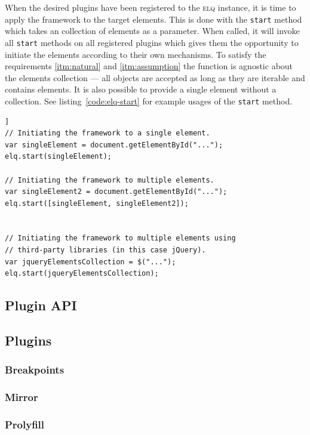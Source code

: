 \documentclass[a4paper,11pt]{kth-mag}
\newcommand{\code}[1]{\texttt{#1}}
\begin{document}
          When the desired plugins have been registered to the \textsc{elq} instance, it is time to apply the framework to the target elements.
          This is done with the \code{start} method which takes an collection of elements as a parameter.
          When called, it will invoke all \code{start} methods on all registered plugins which gives them the opportunity to initiate the elements according to their own mechanisms.
          To satisfy the requirements \ref{itm:natural} and \ref{itm:assumption} the function is agnostic about the elements collection --- all objects are accepted as long as they are iterable and contains elements.
          It is also possible to provide a single element without a collection.
          See listing~\ref{code:elq-start} for example usages of the \code{start} method.
          \begin{lstlisting}[caption={Example usages of the \code{start} method. The method only requires an iterable collection, so it is library agnostic.},captionpos=b,label={code:elq-start}]]
// Initiating the framework to a single element.
var singleElement = document.getElementById("...");
elq.start(singleElement);

// Initiating the framework to multiple elements.
var singleElement2 = document.getElementById("...");
elq.start([singleElement, singleElement2]);


// Initiating the framework to multiple elements using
// third-party libraries (in this case jQuery).
var jqueryElementsCollection = $("...");
elq.start(jqueryElementsCollection);
          \end{lstlisting}

        \subsection{Plugin API}
        \subsection{Plugins}
          \subsubsection{Breakpoints}
          \subsubsection{Mirror}
          \subsubsection{Prolyfill}
\end{document}
